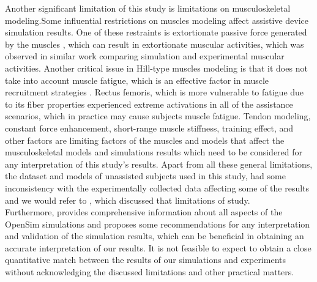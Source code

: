 \documentclass[10pt,letterpaper]{article}
\begin{document}
Another significant limitation of this study is limitations on musculoskeletal modeling.Some influential restrictions on muscles modeling affect assistive device simulation results. One of these restraints is extortionate passive force generated by the muscles \cite{92,93}, which can result in extortionate muscular activities, which was observed in similar work \cite{93} comparing simulation and experimental muscular activities. Another critical issue in Hill-type muscles modeling is that it does not take into account muscle fatigue, which is an effective factor in muscle recruitment strategies \cite{92}. Rectus femoris, which is more vulnerable to fatigue due to its fiber properties \cite{123} experienced extreme activations in all of the assistance scenarios, which in practice may cause subjects muscle fatigue\cite{122}. Tendon modeling, constant force enhancement, short-range muscle stiffness, training effect, and other factors \cite{92} are limiting factors of the muscles and models that affect the musculoskeletal models and simulations results which need to be considered for any interpretation of this study's results. Apart from all these general limitations, the dataset and models of unassisted subjects used in this study, had some inconsistency with the experimentally collected data affecting some of the results and we would refer to \cite{93}, which discussed that limitations of study.\\
Furthermore,\cite{92} provides comprehensive information about all aspects of the OpenSim simulations and proposes some recommendations for any interpretation and validation of the simulation results, which can be beneficial in obtaining an accurate interpretation of our results. It is not feasible to expect to obtain a close quantitative match between the results of our simulations and experiments without acknowledging the discussed limitations and other practical matters.
\end{document}
